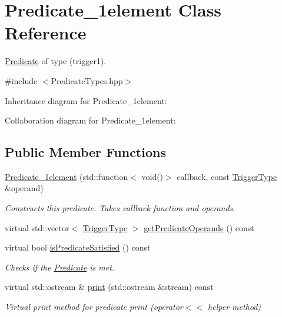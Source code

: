 \hypertarget{classPredicate__1element}{}\section{Predicate\+\_\+1element Class Reference}
\label{classPredicate__1element}


\hyperlink{classPredicate}{Predicate} of type (trigger1).  




{\ttfamily \#include $<$Predicate\+Types.\+hpp$>$}



Inheritance diagram for Predicate\+\_\+1element\+:


Collaboration diagram for Predicate\+\_\+1element\+:
\subsection*{Public Member Functions}
\begin{DoxyCompactItemize}
\item 
\hyperlink{classPredicate__1element_a1dc44523825b352e184d76877690a416}{Predicate\+\_\+1element} (std\+::function$<$ void()$>$ callback, const \hyperlink{structTriggerType}{Trigger\+Type} \&operand)\hypertarget{classPredicate__1element_a1dc44523825b352e184d76877690a416}{}\label{classPredicate__1element_a1dc44523825b352e184d76877690a416}

\begin{DoxyCompactList}\small\item\em Constructs this predicate. Takes callback function and operands. \end{DoxyCompactList}\item 
virtual std\+::vector$<$ \hyperlink{structTriggerType}{Trigger\+Type} $>$ \hyperlink{classPredicate__1element_a1a06f5afce703b5f9f08947d7ba4864d}{get\+Predicate\+Operands} () const 
\item 
virtual bool \hyperlink{classPredicate__1element_ac21e22eb6043ef9137adb8bcb1096e6b}{is\+Predicate\+Satisfied} () const \hypertarget{classPredicate__1element_ac21e22eb6043ef9137adb8bcb1096e6b}{}\label{classPredicate__1element_ac21e22eb6043ef9137adb8bcb1096e6b}

\begin{DoxyCompactList}\small\item\em Checks if the \hyperlink{classPredicate}{Predicate} is met. \end{DoxyCompactList}\item 
virtual std\+::ostream \& \hyperlink{classPredicate__1element_ab3766daea334e44676a49a29160feb72}{print} (std\+::ostream \&stream) const \hypertarget{classPredicate__1element_ab3766daea334e44676a49a29160feb72}{}\label{classPredicate__1element_ab3766daea334e44676a49a29160feb72}

\begin{DoxyCompactList}\small\item\em Virtual print method for predicate print (operator$<$$<$ helper method) \end{DoxyCompactList}\end{DoxyCompactItemize}
